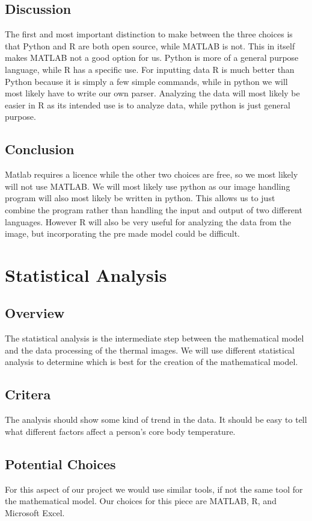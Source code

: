 \documentclass[10pt, draftclsnofoot, onecolumn]{IEEEtran}
\begin{document}
	\subsection{Discussion}
	The first and most important distinction to make between the three choices is that Python and R are both open source, while MATLAB is not. This in itself makes MATLAB not a good option for us. Python is more of a general purpose language, while R has a specific use. For inputting data R is much better than Python because it is simply a few simple commands, while in python we will most likely have to write our own parser. Analyzing the data will most likely be easier in R as its intended use is to analyze data, while python is just general purpose.
	\subsection{Conclusion}
	Matlab requires a licence while the other two choices are free, so we most likely will not use MATLAB. We will most likely use python as our image handling program will also most likely be written in python. This allows us to just combine the program rather than handling the input and output of two different languages. However R will also be very useful for analyzing the data from the image, but incorporating the pre made model could be difficult.
\section{Statistical Analysis}
	\subsection{Overview}
	The statistical analysis is the intermediate step between the mathematical model and the data processing of the thermal images. We will use different statistical analysis to determine which is best for the creation of the mathematical model.
	\subsection{Critera}
	The analysis should show some kind of trend in the data. It should be easy to tell what different factors affect a person’s core body temperature.
	\subsection{Potential Choices}
	For this aspect of our project we would use similar tools, if not the same tool for the mathematical model. Our choices for this piece are MATLAB, R, and Microsoft Excel.
\end{document}
